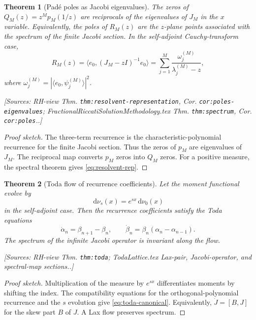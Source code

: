 \documentclass[11pt]{article}
\newtheorem{theorem}{Theorem}[section]
\theoremstyle{definition}
\newcommand{\dd}{\,\mathrm{d}}
\newcommand{\Source}[1]{\par\smallskip\noindent\textup{[Sources: #1.]}}
\begin{document}
\begin{theorem}[Padé poles as Jacobi eigenvalues]\label{thm:poles-eigenvalues}
The zeros of $Q_M(z)=z^Mp_M(1/z)$ are reciprocals of the eigenvalues of $J_M$ in the $x$ variable.
Equivalently,
the poles of $R_M(z)$ are the $z$-plane points associated with the spectrum of the finite Jacobi section.
In the self-adjoint Cauchy-transform case,
\begin{equation}\label{eq:resolvent-rep}
        R_M(z)=\langle e_0,(J_M-zI)^{-1}e_0\rangle
        =\sum_{j=1}^M\frac{\omega_j^{(M)}}{\lambda_j^{(M)}-z},
\end{equation}
where $\omega_j^{(M)}=|\langle e_0,\psi_j^{(M)}\rangle|^2$.
\Source{RH-view Thm. \texttt{thm:resolvent-representation}, Cor. \texttt{cor:poles-eigenvalues}; FractionalRiccatiSolutionMethodology.tex Thm. \texttt{thm:spectrum}, Cor. \texttt{cor:poles}.}
\end{theorem}

\begin{proof}[Proof sketch]
The three-term recurrence is the characteristic-polynomial recurrence for the finite Jacobi section.
Thus the zeros of $p_M$ are eigenvalues of $J_M$.
The reciprocal map converts $p_M$ zeros into $Q_M$ zeros.
For a positive measure,
the spectral theorem gives \eqref{eq:resolvent-rep}.
\end{proof}

\begin{theorem}[Toda flow of recurrence coefficients]\label{thm:toda}
Let the moment functional evolve by
\begin{equation}\label{eq:moment-flow}
        \dd\nu_s(x)=e^{sx}\dd\nu_0(x)
\end{equation}
in the self-adjoint case.
Then the recurrence coefficients satisfy the Toda equations
\begin{equation}\label{eq:toda-canonical}
        \dot{\alpha}_n=\beta_{n+1}-\beta_n,
        \qquad
        \dot{\beta}_n=\beta_n(\alpha_n-\alpha_{n-1}).
\end{equation}
The spectrum of the infinite Jacobi operator is invariant along the flow.
\Source{RH-view Thm. \texttt{thm:toda}; TodaLattice.tex Lax-pair, Jacobi-operator, and spectral-map sections.}
\end{theorem}

\begin{proof}[Proof sketch]
Multiplication of the measure by $e^{sx}$ differentiates moments by shifting the index.
The compatibility equations for the orthogonal-polynomial recurrence and the $s$ evolution give \eqref{eq:toda-canonical}.
Equivalently,
$\dot J=[B,J]$ for the skew part $B$ of $J$.
A Lax flow preserves spectrum.
\end{proof}
\end{document}
